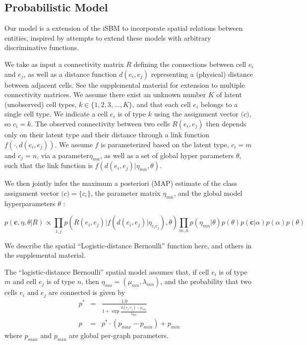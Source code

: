 \documentclass{article}
\renewcommand{\vec}[1]{\mathbf{#1}}
\begin{document}
\subsection{Probabilistic Model}

Our model is a extension of the iSBM
\autocite{Kemp2006a,Xu2006} to incorporate spatial relations between entities,
inspired by attempts to extend these models with arbitrary
discriminative functions\autocite{Murphy2012}.

We take as input a connectivity matrix $R$ defining the connections
between cell $e_i$ and $e_j$, as well as a distance function $d(e_i,
e_j)$ representing a (physical) distance between adjacent cells. See
the supplemental material for extension to multiple connectivity
matrices. We assume there exist an unknown number $K$ of latent
(unobserved) cell types, $k \in \{1, 2, 3, \dots, K\}$, and that each
cell $e_i$ belongs to a single cell type. We indicate a cell $e_i$ is
of type $k$ using the assignment vector $\vec(c)$, so $c_i = k$. The
observed connectivity between two cells $R(e_i, e_j)$ then depends
only on their latent type and their distance through a link function
$f(\cdot, d(e_i, e_j))$. We assume $f$ is parameterized based on the
latent type, $c_i=m$ and $c_j=n$, via a parameter$\eta_{mn}$, as well
as a set of global hyper parameters $\theta$, such that the link
function is $f(d(e_i, e_j) | \eta_{mn}, \theta)$. 


We then jointly infer the maximum a posteriori (MAP) estimate of the
class assignment vector $\vec(c) = \{c_i\}$, the parameter matrix $\eta_{mn}$, and
the global model hyperparameters $\theta$ :

\begin{equation}
  p(\vec{c}, \eta, \theta | R ) \propto \prod_{i, j} p(R(e_i, e_j) | f(d(e_i, e_j) | \eta_{c_ic_j}), \theta) \prod_{m, n} p(\eta_{mn} | \theta)  p(\theta) p(\vec{c} | \alpha) p(\alpha) p(\theta)
\end{equation}





We describe the spatial ``Logistic-distance Bernoulli''  function here,
and others in the supplemental material. 

The ``logistic-distance Bernoulli'' spatial model assumes that, if cell
$e_i$ is of type $m$ and cell $e_j$ is of type $n$, then $\eta_{mn}
= (\mu_{mn}, \lambda_{mn})$, and the probability that two cells $e_i$
and $e_j$ are connected is given by
\begin{eqnarray}
p^* &=& \frac{1.0}{1 + \exp \frac{d(e_i, e_j) - \mu_{mn}}{\lambda_{mn}}}\\
p &= & p^* \cdot (p_{max} - p_{min}) + p_{min}
\end{eqnarray}
where $p_{max}$ and $p_{min}$ are global per-graph parameters. 
\end{document}
